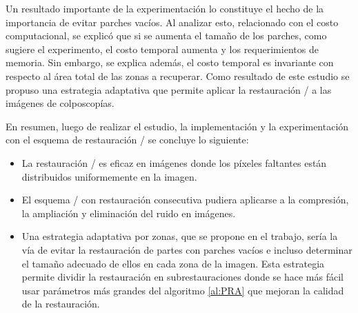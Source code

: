 \begin{conclusions}
Un resultado importante de la experimentación lo constituye el hecho de la importancia de evitar parches vacíos. Al analizar esto, relacionado con el costo computacional, se explicó que si se aumenta el tamaño de los parches, como sugiere el experimento, el costo temporal aumenta y los requerimientos de memoria. Sin embargo, se explica además, el costo temporal es invariante con respecto al área total de las zonas a recuperar. Como resultado de este estudio se propuso una estrategia adaptativa que permite aplicar la restauraci\'on \SOP/ a las im\'agenes de colposcop\'ias.

En resumen, luego de realizar el estudio, la implementaci\'on y la experimentación con el esquema de restauraci\'on \SOP/ se concluye lo siguiente:
\begin{itemize}
	\item La restauración \SOP/ es eficaz en imágenes donde los píxeles faltantes están distribuidos uniformemente en la imagen.
	\item El esquema \SOP/ con restauración consecutiva pudiera aplicarse a la compresi\'on, la ampliación y eliminación del ruido en imágenes.
	\item Una estrategia adaptativa por zonas, que se propone en el trabajo, sería la vía de evitar la restauración de partes con parches vacíos e incluso determinar el tamaño adecuado de ellos en cada zona de la imagen. Esta estrategia permite dividir la restauraci\'on en subrestauraciones donde se hace m\'as f\'acil usar par\'ametros m\'as grandes del algoritmo \ref{al:PRA} que mejoran la calidad de la restauraci\'on.
\end{itemize}

\end{conclusions}

